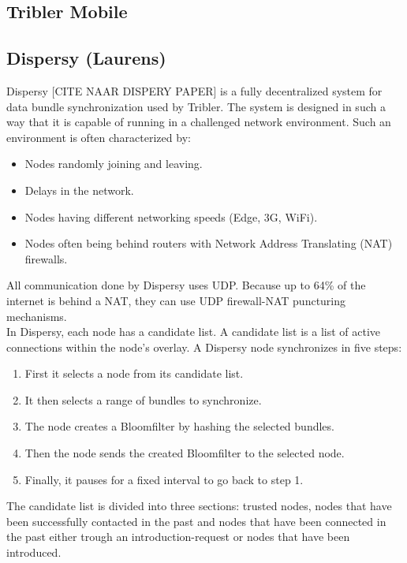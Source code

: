 \documentclass[11pt]{article}
\begin{document}
\subsection{Tribler Mobile}

\subsection{Dispersy (Laurens)}
Dispersy [CITE NAAR DISPERY PAPER] is a fully decentralized system for data bundle synchronization used by Tribler. The system is designed in such a way that it is capable of running in a challenged network environment. Such an environment is often characterized by:
\begin{itemize}
\item Nodes randomly joining and leaving.
\item Delays in the network.
\item Nodes having different networking speeds (Edge, 3G, WiFi).
\item Nodes often being behind routers with Network Address Translating (NAT) firewalls.
\end{itemize}

All communication done by Dispersy uses UDP. Because up to 64\% of the internet is behind a NAT, they can use UDP firewall-NAT puncturing mechanisms.\\

In Dispersy, each node has a candidate list. A candidate list is a list of active connections within the node's overlay. A Dispersy node synchronizes in five steps:

\begin{enumerate}
\item First it selects a node from its candidate list.
\item It then selects a range of bundles to synchronize.
\item The node creates a Bloomfilter by hashing the selected bundles.
\item Then the node sends the created Bloomfilter to the selected node.
\item Finally, it pauses for a fixed interval to go back to step 1.
\end{enumerate}

The candidate list is divided into three sections: trusted nodes, nodes that have been successfully contacted in the past and nodes that have been connected in the past either trough an introduction-request or nodes that have been introduced.\\
\end{document}
